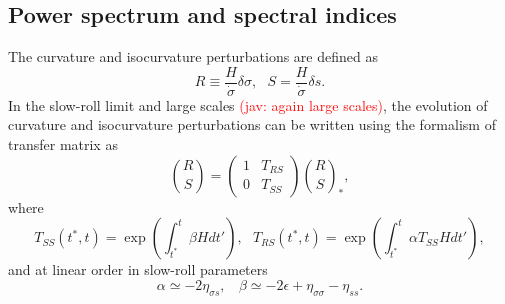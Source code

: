 \documentclass[amssymb,twocolumn,prd,nofootinbib,showpacs]{revtex4-1}
\newcommand{\jav}[1]{\textcolor{red}{(jav: #1)}}
\begin{document}
\subsection{Power spectrum and spectral indices}

The curvature and isocurvature perturbations are defined as
%
\begin{equation}\label{RS}
R\equiv\frac{H}{\dot\sigma}\delta \sigma, \ \ \ S=\frac{H}{\dot \sigma}\delta s.
\end{equation}
%
In the slow-roll limit and large scales \jav{again large scales}, the evolution of curvature and isocurvature perturbations can be written using the formalism of transfer matrix as
%
\begin{equation}
\binom{R }{S}=\begin{pmatrix}1 & T_{RS}\\ 0& T_{SS}\end{pmatrix}\binom{R}{S}_*,
\end{equation}
where
\begin{subequations}
\begin{equation}
T_{SS}(t^*,t)=\exp\left(\int^t_{t^*}\beta Hdt'\right), \ \ \
\end{equation}
\begin{equation}\label{TRS}
T_{RS}(t^*,t)=\exp\left(\int^t_{t^*}\alpha T_{SS}Hdt'\right),
\end{equation}
\end{subequations}
%
and at linear order in slow-roll parameters
%
\begin{equation}
\alpha\simeq -2\eta_{\sigma s}, \ \ \ \ \beta\simeq-2\epsilon+\eta_{\sigma\sigma}-\eta_{ss}.
\end{equation}
\end{document}
